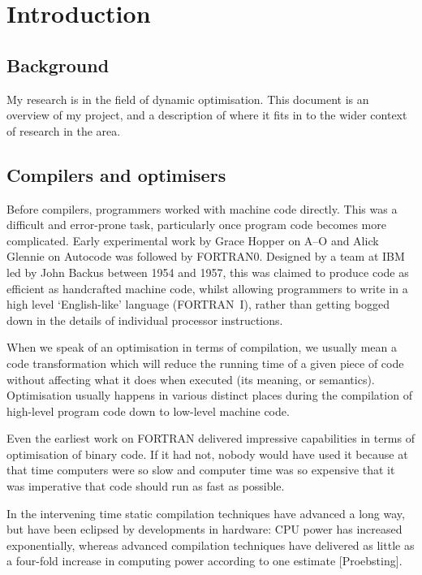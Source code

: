 \chapter{Introduction}

\section{Background}

My research is in the field of dynamic optimisation. This document is an overview of my project, and a description of where it fits in to the wider context of research in the area.

\section{Compilers and optimisers}

Before compilers, programmers worked with machine code directly. This was a difficult and error-prone task, particularly once program code becomes more complicated. Early experimental work by Grace Hopper on \mbox{A--O} and Alick Glennie on Autocode was followed by FORTRAN0. Designed by a team at IBM led by John Backus between 1954 and 1957, this was claimed to produce code as efficient as handcrafted machine code, whilst allowing programmers to write in a high level `English-like' language (FORTRAN~I), rather than getting bogged down in the details of individual processor instructions.

When we speak of an optimisation in terms of compilation, we usually mean a code transformation which will reduce the running time of a given piece of code without affecting what it does when executed (its meaning, or semantics). Optimisation usually happens in various distinct places during the compilation of high-level program code down to low-level machine code.

Even the earliest work on FORTRAN delivered impressive capabilities in terms of optimisation of binary code. If it had not, nobody would have used it because at that time computers were so slow and computer time was so expensive that it was imperative that code should run as fast as possible.

In the intervening time static compilation techniques have advanced a long way, but have been eclipsed by developments in hardware: CPU power has increased exponentially, whereas advanced compilation techniques have delivered as little as a four-fold increase in computing power according to one estimate [Proebsting].


